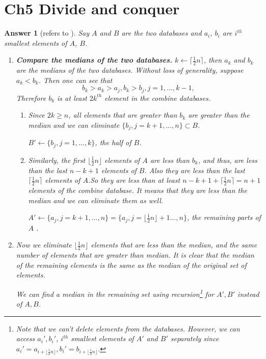 \documentclass[11pt]{article}
\theoremstyle{numberplain}
\theoremstyle{nonumberplain}
\newtheorem{ans}{Answer}
\def\half{{\frac12}}
\newcommand{\cel}[1]{{\lceil {#1} \rceil}}
\newcommand{\flr}[1]{{\lfloor {#1} \rfloor}}
\newcommand{\0}{{\mathbf{0}}}
\begin{document}
\section{Ch5 Divide and conquer}
\begin{ans}[refers to \cite{solcornell}]
Say $A$ and $B$ are the two databases and $a_i$, $b_i$
are $i^{th}$ smallest elements of $A$, $B$.
\begin{enumerate}
\item \textbf{Compare the medians of the two databases.}
 $k\leftarrow \cel{\half n }$, then $a_k$ and $b_k$ are 
the medians of the two     
databases.
Without loss of generality, suppose $a_k<b_k$.
Then one can see that 
$$b_k>a_k>a_j,b_k>b_j,j=1,\ldots,k-1,$$
Therefore $b_k$ is at least $2k^{th}$ element in the combine databases.
\begin{enumerate}
\item Since $2k \ge n$, all elements that are greater than $b_k$ are greater
than the median and we can eliminate $\{b_j	,j=k+1,\ldots,n\}\subset B$.\par 
$B'\leftarrow \{b_j,j=1,\ldots, k\}$, the half of $B$.

\item Similarly, the first $\flr{\half n}$ elements of $A$ are less than $b_k$, and thus, are less than the last $n-k+1$ elements of $B$. Also they are less than the last $\cel{\half n }$ elements of $A$.So they are less than at least $n-k+1+\cel{\half n }=n+1$ elements of the combine database. It means that they are less than the median and we can eliminate them as well. \par 
$A'\leftarrow \{a_j,j={k+1},\ldots,n\}=\{a_j,j=\flr{\half n }+1\ldots,n\}$, the remaining parts of $A$ .
\end{enumerate}	


\item Now we eliminate $\flr{\half n}$ elements that are less than the median,
and the same number of elements that are greater than median.
It is clear that the
median of the remaining elements is the same as 
the median of the original set of   
elements.\par 
We can find a median in the remaining set 
using recursion\footnote{Note that we can't delete elements from the databases.
However, we can access $a_i',b_i'$, $i^{th}$ smallest elements of $A'$ and $B'$ separately since $a_i'=a_{i+\flr{\half n }}, b_i'=b_{i+\flr{\half n }}$.} for $A', B'$ instead of $A,B$.    

\end{enumerate}


\end{ans}
\end{document}
